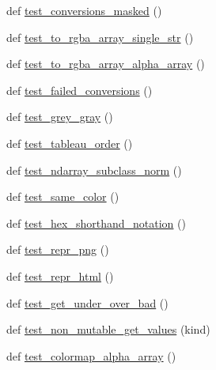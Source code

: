 \begin{DoxyCompactItemize}
\item 
def \hyperlink{namespacematplotlib_1_1tests_1_1test__colors_aa8f94b7a848ea5556dbd953fb7dc6ffe}{test\+\_\+conversions\+\_\+masked} ()
\item 
def \hyperlink{namespacematplotlib_1_1tests_1_1test__colors_a18293105f2144955c2a8289992995cc9}{test\+\_\+to\+\_\+rgba\+\_\+array\+\_\+single\+\_\+str} ()
\item 
def \hyperlink{namespacematplotlib_1_1tests_1_1test__colors_a8ff41f4ede17aef32529566ea3a1de66}{test\+\_\+to\+\_\+rgba\+\_\+array\+\_\+alpha\+\_\+array} ()
\item 
def \hyperlink{namespacematplotlib_1_1tests_1_1test__colors_a7de94cb12b81db58800f779e238f9d7d}{test\+\_\+failed\+\_\+conversions} ()
\item 
def \hyperlink{namespacematplotlib_1_1tests_1_1test__colors_ad179158c65bae03f70609f925f529368}{test\+\_\+grey\+\_\+gray} ()
\item 
def \hyperlink{namespacematplotlib_1_1tests_1_1test__colors_ac190014980392be24ca092b6236f3097}{test\+\_\+tableau\+\_\+order} ()
\item 
def \hyperlink{namespacematplotlib_1_1tests_1_1test__colors_ae1c13e5903424e04001cfdd7a04610f8}{test\+\_\+ndarray\+\_\+subclass\+\_\+norm} ()
\item 
def \hyperlink{namespacematplotlib_1_1tests_1_1test__colors_a908035a17c1a5c0bec1e8804f932b4dd}{test\+\_\+same\+\_\+color} ()
\item 
def \hyperlink{namespacematplotlib_1_1tests_1_1test__colors_adbf8e894a00d2af5fc2fc73f9fb3626a}{test\+\_\+hex\+\_\+shorthand\+\_\+notation} ()
\item 
def \hyperlink{namespacematplotlib_1_1tests_1_1test__colors_a477d554f268d394804671501cedfcdb9}{test\+\_\+repr\+\_\+png} ()
\item 
def \hyperlink{namespacematplotlib_1_1tests_1_1test__colors_a8e9f7a73fc21fc43451c35f31a8d02c0}{test\+\_\+repr\+\_\+html} ()
\item 
def \hyperlink{namespacematplotlib_1_1tests_1_1test__colors_ad29f8664a3ba1c09dad1a19aae79dfd8}{test\+\_\+get\+\_\+under\+\_\+over\+\_\+bad} ()
\item 
def \hyperlink{namespacematplotlib_1_1tests_1_1test__colors_afc3352160c5905741be84b22e8014a88}{test\+\_\+non\+\_\+mutable\+\_\+get\+\_\+values} (kind)
\item 
def \hyperlink{namespacematplotlib_1_1tests_1_1test__colors_a1b1678336735dbc80c0eb1b20bd719b1}{test\+\_\+colormap\+\_\+alpha\+\_\+array} ()
\item 

\end{DoxyCompactItemize}
